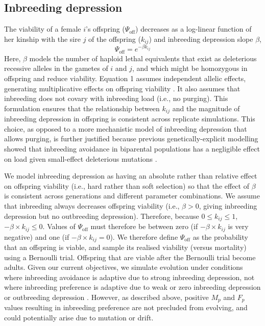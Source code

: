 \documentclass[10pt,letterpaper]{article}
\begin{document}
\subsection*{Inbreeding depression}

The viability of a female $i$'s offspring ($\Psi_{\textrm{off}}$) decreases as a log-linear function of her kinship with the sire $j$ of the offspring ($k_{ij}$) and inbreeding depression slope $\beta$,
\begin{equation}
\Psi_{\textrm{off}} = e^{-\beta k_{ij}}
\end{equation}
Here, $\beta$ models the number of haploid lethal equivalents that exist as deleterious recessive alleles in the gametes of $i$ and $j$, and which might be homozygous in offspring and reduce viability. Equation 1 assumes independent allelic effects, generating multiplicative effects on offspring viability \cite[][]{Morton1956, Mills1994}. It also assumes that inbreeding does not covary with inbreeding load (i.e., no purging). This formulation ensures that the relationship between $k_{ij}$ and the magnitude of inbreeding depression in offspring is consistent across replicate simulations. This choice, as opposed to a more mechanistic model of inbreeding depression that allows purging, is further justified because previous genetically-explicit modelling \cite[][]{Duthie2016a} showed that inbreeding avoidance in biparental populations has a negligible effect on load given small-effect deleterious mutations \cite[see also][]{Wang1999, Guillaume2006}. 

We model inbreeding depression as having an absolute rather than relative effect on offspring viability (i.e., hard rather than soft selection) so that the effect of $\beta$ is consistent across generations and different parameter combinations. We assume that inbreeding always decreases offspring viability (i.e., $\beta > 0$, giving inbreeding depression but no outbreeding depression). Therefore, because $0 \leq k_{ij} \leq 1$, $-\beta \times k_{ij} \leq 0$. Values of $\Psi_{\textrm{off}}$ must therefore be between zero (if $-\beta \times k_{ij}$ is very negative) and one (if $-\beta \times k_{ij} = 0$). We therefore define $\Psi_{\textrm{off}}$ as the probability that an offspring is viable, and sample its realised viability (versus mortality) using a Bernoulli trial. Offspring that are viable after the Bernoulli trial become adults. Given our current objectives, we simulate evolution under conditions where inbreeding avoidance is adaptive due to strong inbreeding depression, not where inbreeding preference is adaptive due to weak or zero inbreeding depression \cite[][]{Parker1979, Kokko2006, Duthie2016a} or outbreeding depression \cite[][]{Bateson1983, Greeff2009}. However, as described above, positive $M_{p}$ and $F_{p}$ values resulting in inbreeding preference are not precluded from evolving, and could potentially arise due to mutation or drift.
\end{document}
